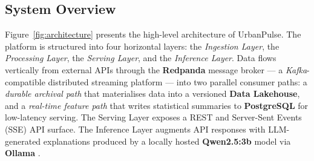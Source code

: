   \subsection{System Overview}
  \label{subsec:system_overview}                                                                                                                          
                                                                                                                                                          
  Figure~\ref{fig:architecture} presents the high-level architecture of
  UrbanPulse. The platform is structured into four horizontal layers:
  the \textit{Ingestion Layer}, the \textit{Processing Layer}, the                                                                                        
  \textit{Serving Layer}, and the \textit{Inference Layer}. Data flows                                                                                    
  vertically from external APIs through the \textbf{Redpanda} message broker                                                                              
  — a \textit{Kafka}-compatible distributed streaming platform                                                                                            
  \cite{redpanda_whitepaper} — into two parallel consumer paths: a                                                                                        
  \textit{durable archival path} that materialises data into a versioned                                                                                  
  \textbf{Data Lakehouse}, and a \textit{real-time feature path} that writes                                                                              
  statistical summaries to \textbf{PostgreSQL} for low-latency serving.                                                                                   
  The Serving Layer exposes a REST and Server-Sent Events (SSE) API surface.                                                                              
  The Inference Layer augments API responses with LLM-generated explanations                                                                              
  produced by a locally hosted \textbf{Qwen2.5:3b} model via                                                                                              
  \textbf{Ollama} \cite{qwen25_report}.                                                                                                                   
                  
